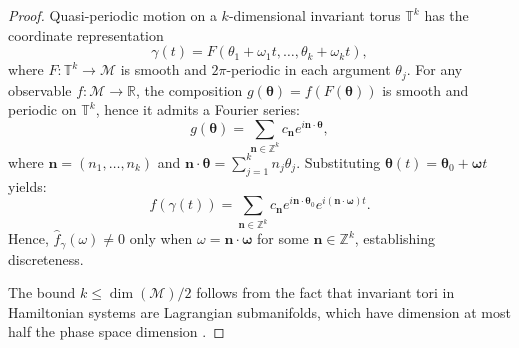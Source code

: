 \documentclass[twocolumn,10pt,a4paper]{article}
\theoremstyle{remark}
\newcommand{\manifold}{\mathcal{M}}
\newcommand{\Reals}{\mathbb{R}}
\newcommand{\Integers}{\mathbb{Z}}
\begin{document}
\begin{proof}
Quasi-periodic motion on a $k$-dimensional invariant torus $\mathbb{T}^k$ has the coordinate representation
\begin{equation}
\gamma(t) = F(\theta_1 + \omega_1 t, \ldots, \theta_k + \omega_k t),
\end{equation}
where $F: \mathbb{T}^k \to \manifold$ is smooth and $2\pi$-periodic in each argument $\theta_j$. For any observable $f: \manifold \to \Reals$, the composition $g(\boldsymbol{\theta}) = f(F(\boldsymbol{\theta}))$ is smooth and periodic on $\mathbb{T}^k$, hence it admits a Fourier series:
\begin{equation}
g(\boldsymbol{\theta}) = \sum_{\mathbf{n} \in \Integers^k} c_{\mathbf{n}} e^{i \mathbf{n} \cdot \boldsymbol{\theta}},
\end{equation}
where $\mathbf{n} = (n_1, \ldots, n_k)$ and $\mathbf{n} \cdot \boldsymbol{\theta} = \sum_{j=1}^k n_j \theta_j$. Substituting $\boldsymbol{\theta}(t) = \boldsymbol{\theta}_0 + \boldsymbol{\omega} t$ yields:
\begin{equation}
f(\gamma(t)) = \sum_{\mathbf{n} \in \Integers^k} c_{\mathbf{n}} e^{i \mathbf{n} \cdot \boldsymbol{\theta}_0} e^{i (\mathbf{n} \cdot \boldsymbol{\omega}) t}.
\end{equation}
Hence, $\hat{f}_\gamma(\omega) \neq 0$ only when $\omega = \mathbf{n} \cdot \boldsymbol{\omega}$ for some $\mathbf{n} \in \Integers^k$, establishing discreteness.

The bound $k \leq \dim(\manifold)/2$ follows from the fact that invariant tori in Hamiltonian systems are Lagrangian submanifolds, which have dimension at most half the phase space dimension \citep{Arnold1989}.
\end{proof}
\end{document}
